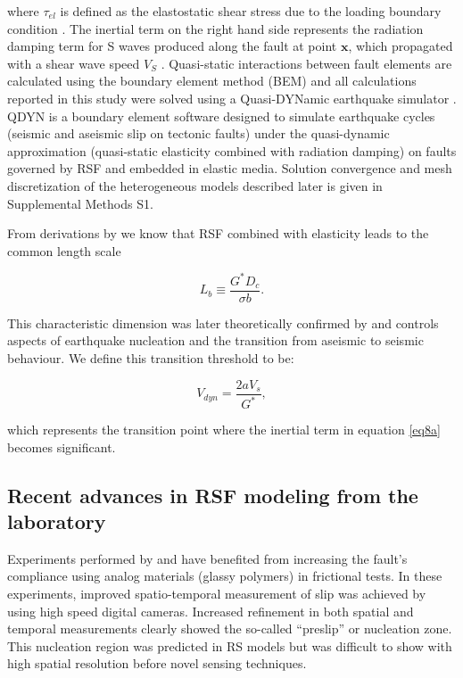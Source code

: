 \documentclass[preprint,1p, 10pt,authoryear]{elsarticle}
\begin{document}
\noindent where $\tau_{el}$ is defined as the elastostatic shear stress due to the loading boundary condition \citep{Horowitz1989}. The inertial term on the right hand side represents the radiation damping term for S waves produced along the fault at point $\mathbf{x}$, which propagated with a shear wave speed $V_{S}$ \citep{Rice1993}. Quasi-static interactions between fault elements are calculated using the boundary element method (BEM) and all calculations reported in this study were solved using a Quasi-DYNamic earthquake simulator \citep{Luo2017}. QDYN is a boundary element software designed to simulate earthquake cycles (seismic and aseismic slip on tectonic faults) under the quasi-dynamic approximation (quasi-static elasticity combined with radiation damping) on faults governed by RSF and embedded in elastic media.  Solution convergence and mesh discretization of the heterogeneous models described later is given in Supplemental Methods S1.

From derivations by \citet{Dieterich1992} we know that RSF combined with elasticity leads to the common length scale

\begin{equation}
\label{eq8b}
L_{b} \equiv \frac{G^{*}D_{c}}{\sigma b}.
\end{equation}  

\noindent This characteristic dimension was later theoretically confirmed by \citet{Rubin2005} and controls aspects of earthquake nucleation and the transition from aseismic to seismic behaviour. We define this transition threshold to be:

\begin{equation}
\label{eq8c}
V_{dyn} = \frac{2 a V_{s}}{G^{*}},
\end{equation}  

\noindent which represents the transition point where the inertial term in equation \eqref{eq8a} becomes significant. 

\subsection{Recent advances in RSF modeling from the laboratory}
\label{advances RSF}
Experiments performed by \citet{Nielsen2010} and \citet{Latour2013} have benefited from increasing the fault's compliance using analog materials (glassy polymers) in frictional tests. In these experiments, improved spatio-temporal measurement of slip was achieved by using high speed digital cameras. Increased refinement in both spatial and temporal measurements clearly showed the so-called ``preslip'' or nucleation zone.  This nucleation region was predicted in RS models \citep{Dieterich1992, Rubin2005, Ampuero2008} but was difficult to show with high spatial resolution before novel sensing techniques.
\end{document}
